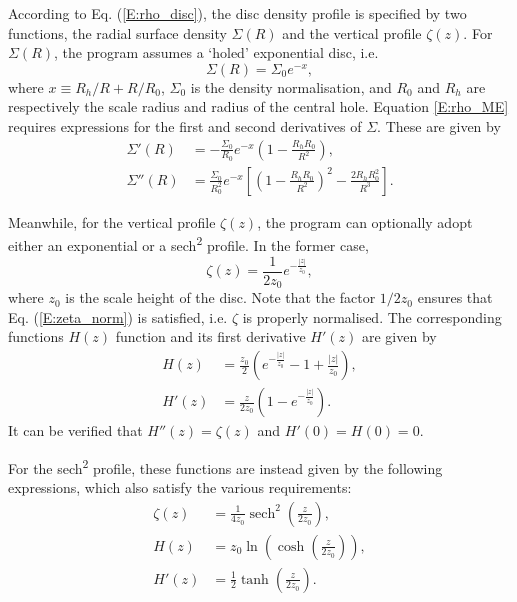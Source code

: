 \documentclass[11pt,a4paper]{article}
\DeclareMathOperator{\sech}{sech}
\begin{document}
According to Eq. (\ref{E:rho_disc}), the disc density profile is specified by two functions, the radial surface density $\Sigma(R)$ and the vertical profile $\zeta(z)$. For $\Sigma(R)$, the program assumes a `holed' exponential disc, i.e.
\begin{equation}
    \Sigma(R) = \Sigma_0 e^{-x},
\end{equation}
where $x \equiv R_h/R+ R/R_0$, $\Sigma_0$ is the density normalisation, and $R_0$ and $R_h$ are respectively the scale radius and radius of the central hole. Equation \ref{E:rho_ME} requires expressions for the first and second derivatives of $\Sigma$. These are given by
\begin{align}
    \Sigma'(R)  & = -\frac{\Sigma_0}{R_0} e^{-x} \left(1 - \frac{R_h R_0}{R^2}\right) ,\\
    \Sigma''(R) & = \frac{\Sigma_0}{R_0^2} e^{-x} \left[\left(1 - \frac{R_h R_0}{R^2}\right)^2 - \frac{2R_h R_0^2}{R^3}\right] .
\end{align}

Meanwhile, for the vertical profile $\zeta(z)$, the program can optionally adopt either an exponential or a sech\textsuperscript{2} profile. In the former case,
\begin{equation}
    \zeta(z) = \frac{1}{2z_0}e^{-\frac{|z|}{z_0}},
\end{equation}
where $z_0$ is the scale height of the disc. Note that the factor $1/2z_0$ ensures that Eq. (\ref{E:zeta_norm}) is satisfied, i.e. $\zeta$ is properly normalised. The corresponding functions $H(z)$ function and its first derivative $H'(z)$ are given by
\begin{align}
    H(z)  & = \frac{z_0}{2} \left(e^{-\frac{|z|}{z_0}} - 1 + \frac{|z|}{z_0}\right), \\
    H'(z) & = \frac{z}{2z_0} \left(1 - e^{-\frac{|z|}{z_0}}\right).
\end{align}
It can be verified that $H''(z) = \zeta(z)$ and $H'(0)=H(0)=0$.

For the sech\textsuperscript{2} profile, these functions are instead given by the following expressions, which also satisfy the various requirements:
\begin{align}
    \zeta(z) & = \frac{1}{4z_0}\sech^2\left(\frac{z}{2z_0}\right),\\
    H(z)     & = z_0 \ln\left(\cosh\left(\frac{z}{2z_0}\right)\right), \\
    H'(z)    & = \frac{1}{2} \tanh\left(\frac{z}{2z_0}\right).
\end{align}
\end{document}
